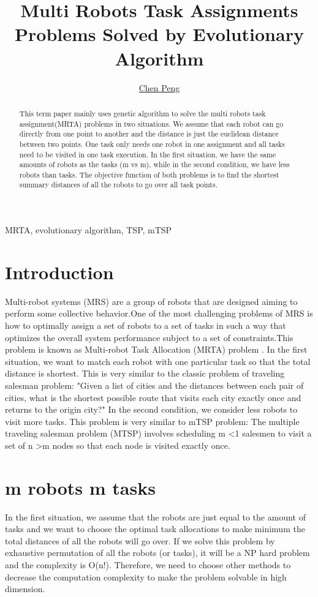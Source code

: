 \documentclass[a4paper]{article}
\title{Multi Robots Task Assignments Problems Solved by Evolutionary Algorithm}
\author{\underline{Chen Peng}
\address[A1]{\it{Mechanical and Aerospace Engineering Department,
UC, Davis, US (penchen@ucdavis.edu, )}}}
\begin{document}

\begin{abstract}
This term paper mainly uses genetic algorithm to solve the multi robots task assignment(MRTA) problems in two situations. We assume that each robot can go directly from one point to another and the distance is just the euclidean distance between two points. One task only needs one robot in one assignment and all tasks need to be visited in one task execution. In the first situation, we have the same amounts of robots as the tasks (m vs m), while in the second condition, we have less robots than tasks. The objective function of both problems is to find the shortest summary distances of all the robots to go over all task points. 
\end{abstract}
\begin{keyword}
MRTA, evolutionary algorithm, TSP, mTSP
\end{keyword}

\maketitle


\section{Introduction}

Multi-robot systems (MRS) are a group of robots that are designed
aiming to perform some collective behavior.One of the most challenging problems of MRS is how to optimally assign a set of robots to a set of tasks in such a way that optimizes the overall system performance subject to a set of constraints.This problem is known as Multi-robot Task Allocation (MRTA) problem \cite{MRTASOFA}. In the first situation, we want to match each robot with one particular task so that the total distance is shortest. This is very similar to the classic problem of traveling salesman problem: "Given a list of cities and the distances between each pair of cities, what is the shortest possible route that visits each city exactly once and returns to the origin city?"\cite{wikiwebTSP} In the second condition, we consider less robots to visit more tasks. This problem is very similar to mTSP problem: The multiple traveling salesman problem (MTSP) involves scheduling m \textless 1 salesmen to visit a set of n \textgreater m nodes so that each node is visited exactly once.\cite{sedighpour2012effective} 

\section{m robots m tasks}
In the first situation, we assume that the robots are just equal to the amount of tasks and we want to choose the optimal task allocations to make minimum the total distances of all the robots will go over. If we solve this problem by exhaustive permutation of all the robots (or tasks), it will be a NP hard problem and the complexity is O(n$!$). Therefore, we need to choose other methods to decrease the computation complexity to make the problem solvable in high dimension.
\end{document}
